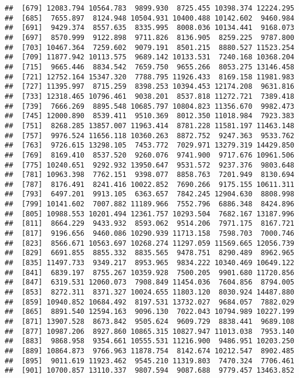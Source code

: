 \documentclass[]{article}
\begin{document}
\begin{verbatim}
##  [679] 12083.794 10564.783  9899.930  8725.455 10398.374 12224.295
##  [685]  7655.897  8124.948 10504.931 10400.488 10142.602  9460.984
##  [691]  9429.374  8557.635  8335.995  8008.036 10134.441  9168.073
##  [697]  8570.999  9122.898  9711.826  8136.905  8259.225  9787.800
##  [703] 10467.364  7259.602  9079.191  8501.215  8880.527 11523.254
##  [709] 11877.942 10113.575  9689.142 10133.531  7240.168 10368.204
##  [715]  9665.446  8834.542  7659.750  9655.266  8053.275 13146.458
##  [721] 12752.164 15347.320  7788.795 11926.433  8169.158 11981.983
##  [727] 11395.997  8715.259  8398.253 10394.453 12174.208  9631.816
##  [733] 12318.465 10796.461  9038.201  8537.818 11272.721  7389.418
##  [739]  7666.269  8895.548 10685.797 10804.823 11356.670  9982.473
##  [745] 12000.890  8539.411  9510.369  8012.350 11018.984  7923.383
##  [751]  8268.285 13857.007 11963.414  8781.228 11581.197 11463.148
##  [757]  9976.524 11656.118 10360.263  8872.752  9247.363  9533.762
##  [763]  9726.615 13298.105  7453.772  7029.971 13279.319 14429.850
##  [769]  8169.410  8537.520  9260.076  9741.900  9717.676 10961.506
##  [775] 10240.651  9292.932 13950.647  9531.572  9237.376  9803.648
##  [781] 10963.398  7762.151  9398.077  8858.763  7201.949  8130.694
##  [787]  8176.491  8241.416 10022.852  7690.266  9175.155 10611.311
##  [793]  6497.201  9913.105  6363.657  7842.245 12904.630  8808.998
##  [799] 10141.602  7007.882 11189.966  7552.796  6886.348  8424.896
##  [805] 10988.553 10201.494 12361.757 10293.504  7682.167 13187.996
##  [811]  8664.229  9433.932  8593.062  9514.206  7971.175  8167.721
##  [817]  9196.656  9460.086 10290.939 11713.158  7598.703  7000.746
##  [823]  8566.671 10563.697 10268.274 11297.059 11569.665 12056.739
##  [829]  6691.855  8855.332  8835.565  9478.751  8290.489  8962.965
##  [835] 11497.733  9349.217  8953.965  9834.222 10340.469 10649.122
##  [841]  6839.197  8755.267 10359.928  7500.205  9901.680 11720.856
##  [847]  6319.531 12060.073  7908.849 11454.036  7604.856  8794.005
##  [853]  8272.311  8371.327 10024.655 11803.120  8030.924 14487.880
##  [859] 10940.852 10684.492  8197.531 13732.027  9684.057  7882.029
##  [865]  8891.540 12594.163  9096.130  7022.043 10794.989 10227.199
##  [871] 13907.528  8673.842  9505.624  9609.729  8838.441  9689.108
##  [877] 10987.206  8927.860 10865.315 10827.947 11013.038  7953.140
##  [883]  9868.958  9354.661 10555.531 11216.900  9486.951 10203.250
##  [889] 10864.873  9766.963 11878.754  8142.674 10212.547  8902.485
##  [895]  9011.619 11923.462  9545.210 11319.803  7470.324  7706.461
##  [901] 10700.857 13110.337  9807.594  9087.688  9779.457 13463.852

\end{verbatim}
\end{document}
